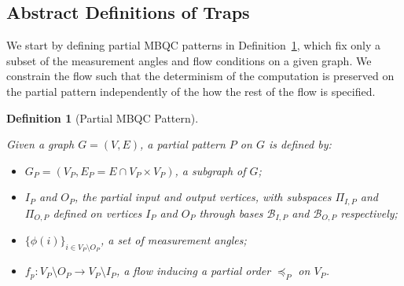 \documentclass[12pt]{iopart}
\renewcommand{\1}{\mathds{1}}
\newtheorem{definition}{Definition}
\begin{document}
\subsection{Abstract Definitions of Traps}
\label{subsec:detect-def}
We start by defining partial MBQC patterns in Definition~\ref{def:pp}, which fix only a subset of the measurement angles and flow conditions on a given graph. We constrain the flow such that the determinism of the computation is preserved on the partial pattern independently of the how the rest of the flow is specified.

\begin{definition}[Partial MBQC Pattern]
\label{def:pp}

Given a graph $G=(V,E)$, a partial pattern $P$ on $G$ is defined by:

\begin{itemize}
\item $G_P = (V_P, E_P = E \cap V_P \times V_P)$, a subgraph of $G$;
\item $I_P$ and $O_P$, the partial input and output vertices, with subspaces $\Pi_{I, P}$ and $\Pi_{O, P}$ defined on vertices $I_P$ and $O_P$ through bases $\mathcal{B}_{I, P}$ and $\mathcal{B}_{O, P}$ respectively;
\item $\{\phi(i)\}_{i\in V_{P} \setminus O_{P}}$, a set of measurement angles;
\item $f_p : V_{P} \setminus O_{P} \rightarrow V_{P} \setminus I_{P}$, a flow inducing a partial order $\preceq_P$ on $V_P$.
\end{itemize}

\end{definition}
\end{document}
